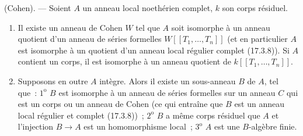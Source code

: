 \begin{theorem}[19.8.8]
\label{0.19.8.8-fr}
\textup{(Cohen).} --- Soient $A$ un anneau local noethérien complet, $k$ son
corps résiduel.


\begin{enumerate}
  \item[\textup{(i)}] Il existe un anneau de Cohen $W$ tel que $A$ soit isomorphe à un
  anneau quotient d'un anneau de séries formelles
  $W[[T_1,\ldots,T_n]]$ (et en particulier $A$ est isomorphe à un quotient d'un
  anneau local régulier complet \textup{(17.3.8)}). Si $A$ contient un corps, il est
  isomorphe à un anneau quotient de $k[[T_1,\ldots,T_n]]$.
  \item[\textup{(ii)}] Supposons en outre $A$ intègre. Alors il existe un sous-anneau
  $B$ de $A$, tel que~: $1^{\mathrm o}$ $B$ est isomorphe à un anneau de séries
  formelles sur un anneau $C$ qui est un corps ou un anneau de Cohen (ce qui
  entraîne que $B$ est un anneau local régulier et complet \textup{(17.3.8)})~;
  $2^{\mathrm o}$ $B$ a même corps résiduel que $A$ et l'injection $B\to A$ est
  un homomorphisme local~; $3^{\mathrm o}$ $A$ est une $B$-algèbre finie.
\end{enumerate}
\end{theorem}

